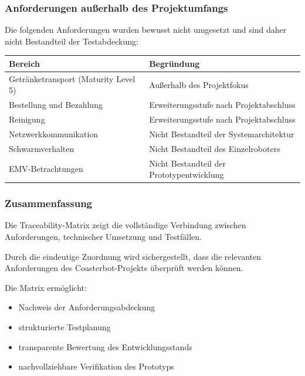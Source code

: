 \documentclass[
  a4paper,
  12pt,
  DIV=12,        %
  parskip=half,  %
  headings=small %
]{scrartcl}
\theoremstyle{definition}
\providecommand{\tightlist}{%
  \setlength{\itemsep}{0pt}\setlength{\parskip}{0pt}}
\theoremstyle{definition}
\begin{document}
\newpage

\subsubsection{Anforderungen außerhalb des
Projektumfangs}\label{anforderungen-auuxdferhalb-des-projektumfangs}

Die folgenden Anforderungen wurden bewusst nicht umgesetzt und sind
daher nicht Bestandteil der Testabdeckung:

\begin{longtable}[]{@{}
  >{\raggedright\arraybackslash}p{}
  >{\raggedright\arraybackslash}p{}@{}}
\toprule\noalign{}
\begin{minipage}[b]{\linewidth}\raggedright
Bereich
\end{minipage} & \begin{minipage}[b]{\linewidth}\raggedright
Begründung
\end{minipage} \\
\midrule\noalign{}
\endhead
\bottomrule\noalign{}
\endlastfoot
Getränketransport (Maturity Level 5) & Außerhalb des Projektfokus \\
Bestellung und Bezahlung & Erweiterungsstufe nach Projektabschluss \\
Reinigung & Erweiterungsstufe nach Projektabschluss \\
Netzwerkkommunikation & Nicht Bestandteil der Systemarchitektur \\
Schwarmverhalten & Nicht Bestandteil des Einzelroboters \\
EMV-Betrachtungen & Nicht Bestandteil der Prototypentwicklung \\
\end{longtable}

\subsubsection{Zusammenfassung}\label{zusammenfassung-6}

Die Traceability-Matrix zeigt die vollständige Verbindung zwischen
Anforderungen, technischer Umsetzung und Testfällen.

Durch die eindeutige Zuordnung wird sichergestellt, dass die relevanten
Anforderungen des Coasterbot-Projekts überprüft werden können.

Die Matrix ermöglicht:

\begin{itemize}
\tightlist
\item
  Nachweis der Anforderungsabdeckung
\item
  strukturierte Testplanung
\item
  transparente Bewertung des Entwicklungsstands
\item
  nachvollziehbare Verifikation des Prototyps
\end{itemize}
\end{document}
